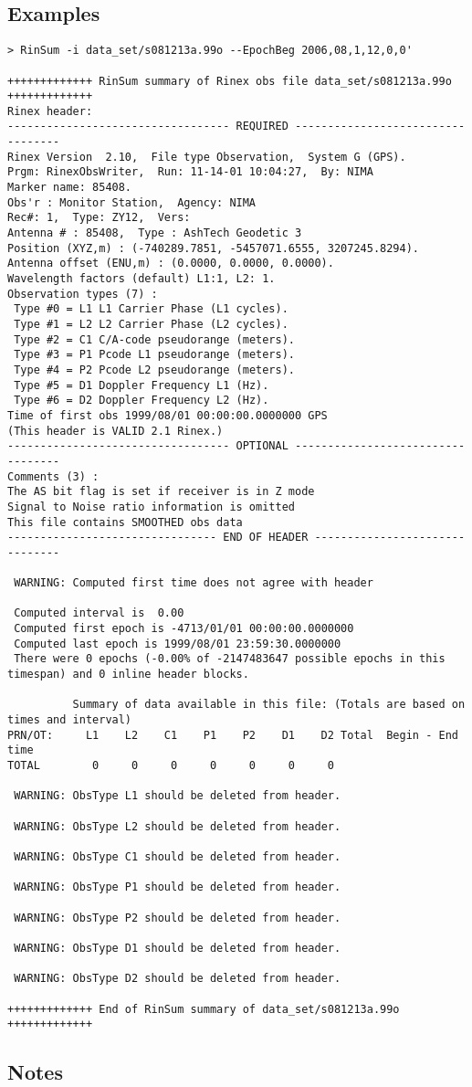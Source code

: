 \subsection{Examples}
\begin{\outputsize}
\begin{lstlisting}
> RinSum -i data_set/s081213a.99o --EpochBeg 2006,08,1,12,0,0'

+++++++++++++ RinSum summary of Rinex obs file data_set/s081213a.99o +++++++++++++
Rinex header:
---------------------------------- REQUIRED ----------------------------------
Rinex Version  2.10,  File type Observation,  System G (GPS).
Prgm: RinexObsWriter,  Run: 11-14-01 10:04:27,  By: NIMA
Marker name: 85408.
Obs'r : Monitor Station,  Agency: NIMA
Rec#: 1,  Type: ZY12,  Vers:
Antenna # : 85408,  Type : AshTech Geodetic 3
Position (XYZ,m) : (-740289.7851, -5457071.6555, 3207245.8294).
Antenna offset (ENU,m) : (0.0000, 0.0000, 0.0000).
Wavelength factors (default) L1:1, L2: 1.
Observation types (7) :
 Type #0 = L1 L1 Carrier Phase (L1 cycles).
 Type #1 = L2 L2 Carrier Phase (L2 cycles).
 Type #2 = C1 C/A-code pseudorange (meters).
 Type #3 = P1 Pcode L1 pseudorange (meters).
 Type #4 = P2 Pcode L2 pseudorange (meters).
 Type #5 = D1 Doppler Frequency L1 (Hz).
 Type #6 = D2 Doppler Frequency L2 (Hz).
Time of first obs 1999/08/01 00:00:00.0000000 GPS
(This header is VALID 2.1 Rinex.)
---------------------------------- OPTIONAL ----------------------------------
Comments (3) :
The AS bit flag is set if receiver is in Z mode
Signal to Noise ratio information is omitted
This file contains SMOOTHED obs data
-------------------------------- END OF HEADER -------------------------------

 WARNING: Computed first time does not agree with header

 Computed interval is  0.00
 Computed first epoch is -4713/01/01 00:00:00.0000000
 Computed last epoch is 1999/08/01 23:59:30.0000000
 There were 0 epochs (-0.00% of -2147483647 possible epochs in this timespan) and 0 inline header blocks.

          Summary of data available in this file: (Totals are based on times and interval)
PRN/OT:     L1    L2    C1    P1    P2    D1    D2 Total  Begin - End time
TOTAL        0     0     0     0     0     0     0

 WARNING: ObsType L1 should be deleted from header.

 WARNING: ObsType L2 should be deleted from header.

 WARNING: ObsType C1 should be deleted from header.

 WARNING: ObsType P1 should be deleted from header.

 WARNING: ObsType P2 should be deleted from header.

 WARNING: ObsType D1 should be deleted from header.

 WARNING: ObsType D2 should be deleted from header.

+++++++++++++ End of RinSum summary of data_set/s081213a.99o +++++++++++++
\end{lstlisting}
\end{\outputsize}

\subsection{Notes}

%
